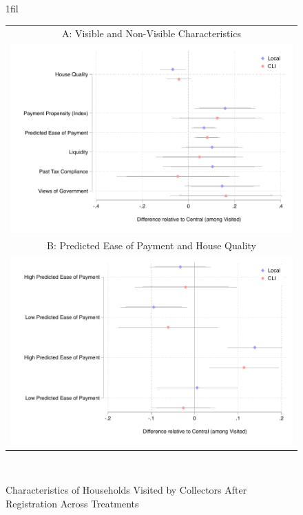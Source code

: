 \documentclass[12pt,english]{article}
\makeatletter
\newcommand*{\centerfloat}{%
  \parindent \z@
  \leftskip \z@ \@plus 1fil \@minus \textwidth
  \rightskip\leftskip
  \parfillskip \z@skip}
\makeatother
\begin{document}

\begin{figure}[H]
\centering{}\caption{Characteristics of Households Visited by Collectors After Registration Across Treatments
\label{fig:main_targeting1}}
\centering
\centerfloat
\begin{tabular}{c}
A: Visible and Non-Visible Characteristics\\
\includegraphics[scale=.62]{Output/chars_visited.pdf}\\
B: Predicted Ease of Payment and House Quality\\
\includegraphics[scale=.8]{Output/chars_PEXHQ.pdf}\\
\end{tabular}
\usebox{\tablebox}\\[1ex]

\end{figure}
\end{document}

